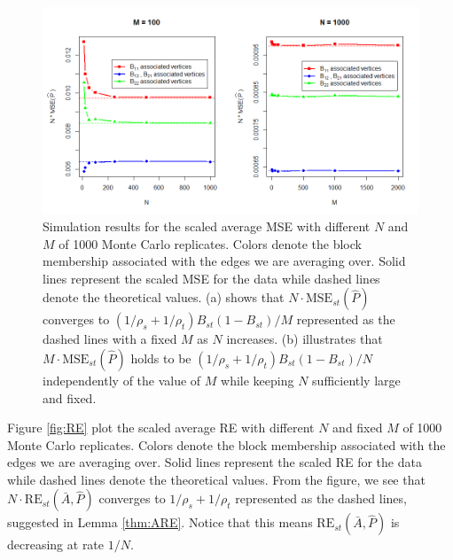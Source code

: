 \begin{figure}[!htb]
	\centering
	\includegraphics[width=16cm]{MSE.png}
	\caption{Simulation results for the scaled average MSE with different $N$ and $M$ of 1000 Monte Carlo replicates. Colors denote the block membership associated with the edges we are averaging over. Solid lines represent the scaled MSE for the data while dashed lines denote the theoretical values.
 (a) shows that $N \cdot \mathrm{MSE}_{st}(\hat{P})$ converges to $(1/\rho_s + 1/\rho_t) B_{st}(1-B_{st}) / M$ represented as the dashed lines with a fixed $M$ as $N$ increases.
 (b) illustrates that $M \cdot \mathrm{MSE}_{st}(\hat{P})$ holds to be $(1/\rho_s + 1/\rho_t) B_{st}(1-B_{st}) / N$ independently of the value of $M$ while keeping $N$ sufficiently large and fixed.
}
	\label{fig:MSE}
\end{figure}




Figure \ref{fig:RE} plot the scaled average RE with different $N$ and fixed $M$ of 1000 Monte Carlo replicates. Colors denote the block membership associated with the edges we are averaging over. Solid lines represent the scaled RE for the data while dashed lines denote the theoretical values. From the figure, we see that $N \cdot \mathrm{RE}_{st}(\bar{A}, \hat{P})$ converges to $1/\rho_s + 1/\rho_t$ represented as the dashed lines, suggested in Lemma \ref{thm:ARE}. Notice that this means $\mathrm{RE}_{st}(\bar{A}, \hat{P})$ is decreasing at rate $1/N$.


